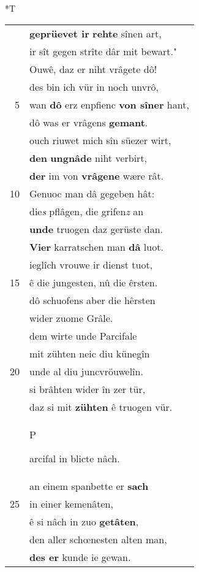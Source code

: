 \documentclass[8pt,a4paper,notitlepage]{article}
\begin{document}
\begin{table}[ht]
\begin{minipage}[t]{0.5\linewidth}
\small
\begin{center}*T
\end{center}
\begin{tabular}{rl}
 & \textbf{geprüevet ir} \textbf{rehte} sînen art,\\ 
 & ir sît gegen strîte dâr mit bewart."\\ 
 & Ouwê, daz er niht vrâgete dô!\\ 
 & des bin ich vür in noch unvrô,\\ 
5 & wan \textbf{dô} erz enpfienc \textbf{von sîner} hant,\\ 
 & dô was er vrâgens \textbf{gemant}.\\ 
 & ouch riuwet mich sîn süezer wirt,\\ 
 & \textbf{den} \textbf{ungnâde} niht verbirt,\\ 
 & \textbf{der} im von \textbf{vrâgene} wære rât.\\ 
10 & Genuoc man dâ gegeben hât:\\ 
 & die\textit{s} pflâgen, die grifen\textit{z} an\\ 
 & \textbf{unde} truogen daz gerüste dan.\\ 
 & \textbf{Vier} karratschen man \textbf{dâ} luot.\\ 
 & ieglîch vrouwe ir dienst tuot,\\ 
15 & ê die jungesten, nû die êrsten.\\ 
 & dô schuofens aber die hêrsten\\ 
 & wider zuome Grâle.\\ 
 & dem wirte unde Parcifale\\ 
 & mit zühten neic diu künegîn\\ 
20 & unde al diu juncvröuwelîn.\\ 
 & si brâhten wider în zer tür,\\ 
 & daz si mit \textbf{zühten} ê truogen vür.\\ 
 & \begin{large}P\end{large}arcifal in blicte nâch.\\ 
 & an einem spanbette er \textbf{sach}\\ 
25 & in einer kemenâten,\\ 
 & ê si nâch in zuo \textbf{getâten},\\ 
 & den aller schœnesten alten man,\\ 
 & \textbf{des er} kunde ie gewan.\\ 

\end{tabular}
\end{minipage}
\end{table}
\end{document}
